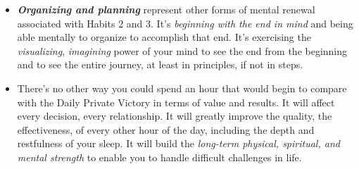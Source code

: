 \documentclass[11pt]{article}
\begin{document}
\begin{itemize}
\item \emph{\textbf{Organizing and planning}} represent other forms of mental renewal associated with Habits 2 and 3. It's \emph{beginning with the end in mind} and being able mentally to organize to accomplish that end. It's exercising the \emph{visualizing}, \emph{imagining} power of your mind to see the end from the beginning and to see the entire journey, at least in principles, if not in steps.

\item There's no other way you could spend an hour that would begin to compare with the Daily Private Victory in terms of value and results. It will affect every decision, every relationship. It will greatly improve the quality, the effectiveness, of every other hour of the day, including the depth and restfulness of your sleep. It will build the \emph{long-term physical, spiritual, and mental strength} to enable you to handle difficult challenges in life.
\end{itemize}
\end{document}
